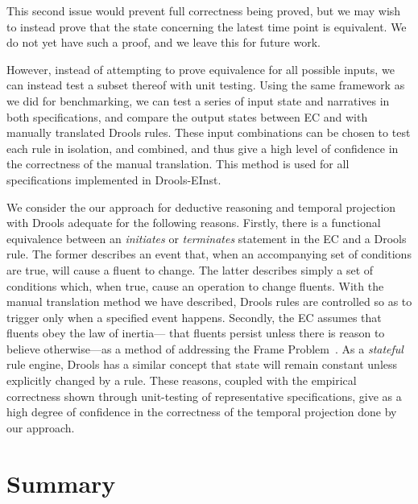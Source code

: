 
This second issue would prevent full correctness being proved, but we may wish
to instead prove that the state concerning the latest time point is
equivalent. We do not yet have such a proof, and we leave this for future work.

However, instead of attempting to prove equivalence for all possible inputs,
we can instead test a subset thereof with unit testing. Using the same
framework as we did for benchmarking, we can test a series of input state and
narratives in both specifications, and compare the output states between
\ac{EC} and with manually translated Drools rules. These input combinations can be
chosen to test each rule in isolation, and combined, and thus give a high
level of confidence in the correctness of the manual translation. This method is used
for all specifications implemented in Drools-EInst.

We consider the our approach for deductive reasoning and temporal projection
with Drools adequate for the following reasons. Firstly, there is a functional
equivalence between an \emph{initiates} or \emph{terminates} statement in the
\ac{EC} and a Drools rule. The former describes an event that, when an
accompanying set of conditions are true, will cause a fluent to change. The
latter describes simply a set of conditions which, when true, cause an
operation to change fluents. With the manual translation method we have described,
Drools rules are controlled so as to trigger only when a specified event
happens. Secondly, the \ac{EC} assumes that fluents obey the law of inertia---
that fluents persist unless there is reason to believe otherwise---as a method
of addressing the Frame Problem~\citep{Shanahan1999}. As a \emph{stateful}
rule engine, Drools has a similar concept that state will remain constant
unless explicitly changed by a rule. These reasons, coupled with the empirical
correctness shown through unit-testing of representative specifications, give
as a high degree of confidence in the correctness of the temporal projection done by our approach.

\section{Summary}

